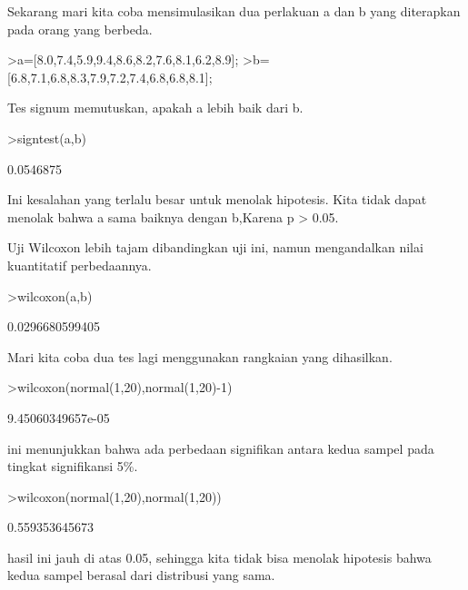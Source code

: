 \documentclass{article}
\begin{document}
\begin{eulernotebook}
\begin{eulercomment}
\begin{eulercomment}
\begin{eulercomment}
\begin{eulercomment}
\begin{eulercomment}
Sekarang mari kita coba mensimulasikan dua perlakuan a dan b yang
diterapkan pada orang yang berbeda.
\end{eulercomment}
\begin{eulerprompt}
>a=[8.0,7.4,5.9,9.4,8.6,8.2,7.6,8.1,6.2,8.9];
>b=[6.8,7.1,6.8,8.3,7.9,7.2,7.4,6.8,6.8,8.1];
\end{eulerprompt}
\begin{eulercomment}
Tes signum memutuskan, apakah a lebih baik dari b.
\end{eulercomment}
\begin{eulerprompt}
>signtest(a,b)
\end{eulerprompt}
\begin{euleroutput}
  0.0546875
\end{euleroutput}
\begin{eulercomment}
Ini kesalahan yang terlalu besar untuk menolak hipotesis. Kita tidak
dapat menolak bahwa a sama baiknya dengan b,Karena p \textgreater{} 0.05.

Uji Wilcoxon lebih tajam dibandingkan uji ini, namun mengandalkan
nilai kuantitatif perbedaannya.
\end{eulercomment}
\begin{eulerprompt}
>wilcoxon(a,b)
\end{eulerprompt}
\begin{euleroutput}
  0.0296680599405
\end{euleroutput}
\begin{eulercomment}
Mari kita coba dua tes lagi menggunakan rangkaian yang dihasilkan.
\end{eulercomment}
\begin{eulerprompt}
>wilcoxon(normal(1,20),normal(1,20)-1)
\end{eulerprompt}
\begin{euleroutput}
  9.45060349657e-05
\end{euleroutput}
\begin{eulercomment}
ini menunjukkan bahwa ada perbedaan signifikan antara kedua sampel
pada tingkat signifikansi 5\%.
\end{eulercomment}
\begin{eulerprompt}
>wilcoxon(normal(1,20),normal(1,20))
\end{eulerprompt}
\begin{euleroutput}
  0.559353645673
\end{euleroutput}
\begin{eulercomment}
hasil ini  jauh di atas 0.05, sehingga kita tidak bisa menolak
hipotesis bahwa kedua sampel berasal dari distribusi yang sama.


\end{eulercomment}
\end{eulercomment}
\end{eulercomment}
\end{eulercomment}
\end{eulercomment}
\end{eulernotebook}
\end{document}
